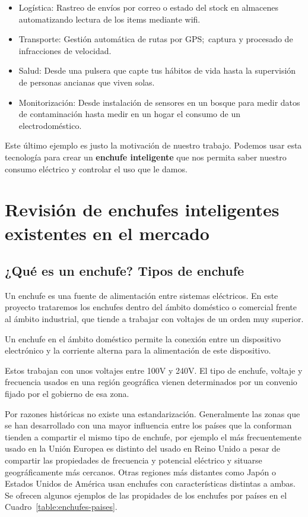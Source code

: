 \documentclass[a4paper,10pt]{article}
\begin{document}
\begin{itemize}
\item
  Logística: Rastreo de envíos por correo o estado del stock en
  almacenes automatizando lectura de los items mediante wifi.
\item
  Transporte: Gestión automática de rutas por GPS;\ captura y procesado
  de infracciones de velocidad.
\item
  Salud: Desde una pulsera que capte tus hábitos de vida hasta
  la supervisión de personas ancianas que viven solas.
\item
  Monitorización: Desde instalación de sensores en un bosque para medir
  datos de contaminación hasta medir en un hogar el consumo de un
  electrodoméstico.
\end{itemize}

Este último ejemplo es justo la motivación de nuestro trabajo. Podemos
usar esta tecnología para crear un \textbf{enchufe inteligente} que
nos permita saber nuestro consumo eléctrico y controlar el uso que le
damos.

\newpage

\section{Revisión de enchufes inteligentes existentes en el
mercado}\label{revision-enchufes}

\subsection{¿Qué es un enchufe? Tipos de
enchufe}\label{tipos-de-enchufe}

Un enchufe es una fuente de alimentación entre sistemas eléctricos. En
este proyecto trataremos los enchufes dentro del ámbito doméstico o
comercial frente al ámbito industrial, que tiende a trabajar con
voltajes de un orden muy superior.

Un enchufe en el ámbito doméstico permite la conexión entre un
dispositivo electrónico y la corriente alterna para la alimentación de
este dispositivo.

Estos trabajan con unos voltajes entre 100V y
240V.\cite{iecIECWorldPlugs} El tipo de enchufe, voltaje y frecuencia
usados en una región geográfica vienen determinados por un convenio
fijado por el gobierno de esa zona.

Por razones históricas\cite{nuevatribunaOrigenFrecuenciasElectricas}
no existe una estandarización. Generalmente las zonas que se han
desarrollado con una mayor influencia entre los países que la
conforman tienden a compartir el mismo tipo de enchufe, por ejemplo el
más frecuentemente usado en la Unión Europea es distinto del usado en
Reino Unido a pesar de compartir las propiedades de frecuencia y
potencial eléctrico y situarse geográficamente más cercanos. Otras
regiones más distantes como Japón o Estados Unidos de América usan
enchufes con características distintas a ambas. Se ofrecen algunos
ejemplos de las propidades de los enchufes por países en el
Cuadro~\ref{table:enchufes-paises}.
\end{document}
